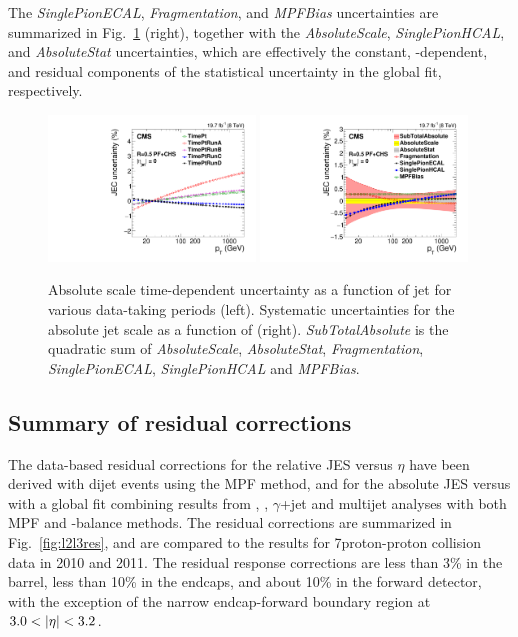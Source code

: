 \documentclass[11pt,twoside,a4paper,cmspaper,final,collab]{cms-tdr}
\begin{document}
The \textit{SinglePionECAL}, \textit{Fragmentation}, and \textit{MPFBias} uncertainties are summarized in Fig.~\ref{fig:l3sys} (right), together with the \textit{AbsoluteScale}, \textit{SinglePionHCAL}, and \textit{AbsoluteStat} uncertainties, which are effectively the constant, \pt-dependent, and residual components of the statistical uncertainty in the global fit, respectively.

\begin{figure}[htbp!]
\centering
\includegraphics[width=0.49\textwidth]{Figure_026-a.pdf}
\includegraphics[width=0.49\textwidth]{Figure_026-b.pdf}
\caption{\label{fig:l3sys}
Absolute scale time-dependent uncertainty as a function of jet \pt for various data-taking periods (left). Systematic uncertainties for the absolute jet scale as a function of \pt (right).
\textit{SubTotalAbsolute} is the quadratic sum of \textit{AbsoluteScale}, \textit{AbsoluteStat}, \textit{Fragmentation}, \textit{SinglePionECAL}, \textit{SinglePionHCAL} and \textit{MPFBias}.
}
\end{figure}

\subsection{Summary of residual corrections}

The data-based residual corrections for the relative JES versus $\eta$ have been derived with dijet events using the MPF method, and for the absolute JES versus \pt with a global fit combining results from \zmmjet, \zeejet, $\gamma$+jet and multijet analyses with both MPF and \pt-balance methods. The residual corrections are summarized in Fig.~\ref{fig:l2l3res}, and are compared to the results for 7\TeV proton-proton collision data in 2010 and 2011.
The residual response corrections are less than 3\% in the barrel, less than 10\% in the endcaps, and about 10\% in the forward detector, with the exception of the narrow endcap-forward boundary region at $3.0<\lvert \eta \rvert<3.2$.
\end{document}
